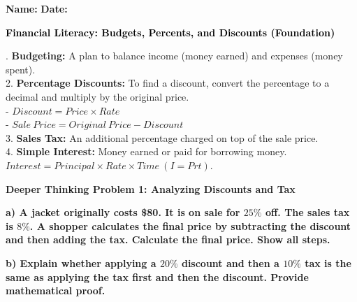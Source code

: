 \documentclass[12pt, letterpaper, fleqn]{article}
\begin{document}
\textbf{Name:} \underline{\hspace{5cm}}
\hfill
\textbf{Date:} \underline{\hspace{3cm}}\\

\begin{tcolorbox}[colback=customteal!20]
    \large\textcolor{black}{\textbf{Financial Literacy: Budgets, Percents, and Discounts (Foundation)}}
\end{tcolorbox}

\vspace{3mm}

. \textbf{Budgeting:} A plan to balance income (money earned) and expenses (money spent). \\
2. \textbf{Percentage Discounts:} To find a discount, convert the percentage to a decimal and multiply by the original price. \\
- $Discount = Price \times Rate$ \\
- $Sale \ Price = Original \ Price - Discount$ \\
3. \textbf{Sales Tax:} An additional percentage charged on top of the sale price. \\
4. \textbf{Simple Interest:} Money earned or paid for borrowing money. $Interest = Principal \times Rate \times Time \ (I = Prt)$.

\vspace{4mm}

\begin{tcolorbox}[colback=yellow!15, colframe=orange, boxrule=1.5pt, arc=4mm, left=6mm, right=6mm, top=5mm, bottom=5mm]
\textbf{Deeper Thinking Problem 1: Analyzing Discounts and Tax}

\medskip

\noindent
\textbf{a) A jacket originally costs \$80. It is on sale for $25\%$ off. The sales tax is $8\%$. A shopper calculates the final price by subtracting the discount and then adding the tax. Calculate the final price. Show all steps.}

\vspace{2cm}

\noindent
\textbf{b) Explain whether applying a $20\%$ discount and then a $10\%$ tax is the same as applying the tax first and then the discount. Provide mathematical proof.}

\vspace{2cm}
\end{tcolorbox}
\newpage
\end{document}
